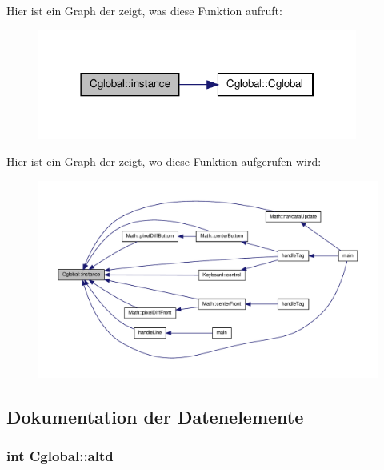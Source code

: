 Hier ist ein Graph der zeigt, was diese Funktion aufruft:\nopagebreak
\begin{figure}[H]
\begin{center}
\leavevmode
\includegraphics[width=298pt]{class_cglobal_a0e96a5f7f00ef5a151da708a17340f08_cgraph}
\end{center}
\end{figure}




Hier ist ein Graph der zeigt, wo diese Funktion aufgerufen wird:\nopagebreak
\begin{figure}[H]
\begin{center}
\leavevmode
\includegraphics[width=400pt]{class_cglobal_a0e96a5f7f00ef5a151da708a17340f08_icgraph}
\end{center}
\end{figure}




\subsection{Dokumentation der Datenelemente}
\hypertarget{class_cglobal_a0e2d4712edf675715bd4bcc554dbcf42}{
\subsubsection[{altd}]{\setlength{\rightskip}{0pt plus 5cm}int {\bf Cglobal::altd}}}
\label{class_cglobal_a0e2d4712edf675715bd4bcc554dbcf42}


